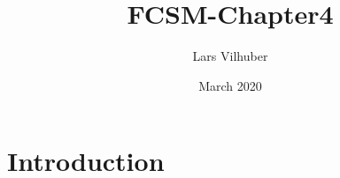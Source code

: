 \documentclass{article}
\title{FCSM-Chapter4}
\author{Lars Vilhuber}
\date{March 2020}
\begin{document}
\maketitle

\section{Introduction}

\citep{reiter_verification_2009}




\end{document}
